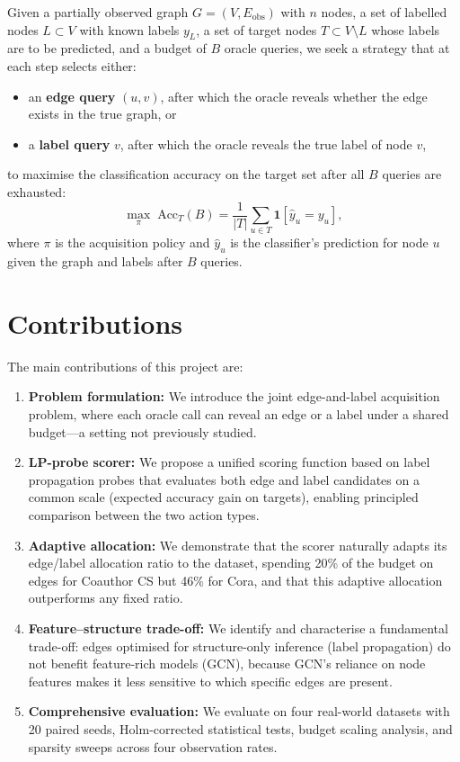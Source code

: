 \documentclass[12pt,a4paper,oneside]{report}
\begin{document}
Given a partially observed graph $G = (V, E_{\text{obs}})$ with $n$ nodes, a set of labelled nodes $L \subset V$ with known labels $y_L$, a set of target nodes $T \subset V \setminus L$ whose labels are to be predicted, and a budget of $B$ oracle queries, we seek a strategy that at each step selects either:
\begin{itemize}[leftmargin=2em]
    \item an \textbf{edge query} $(u, v)$, after which the oracle reveals whether the edge exists in the true graph, or
    \item a \textbf{label query} $v$, after which the oracle reveals the true label of node $v$,
\end{itemize}
to maximise the classification accuracy on the target set after all $B$ queries are exhausted:
\begin{equation}
    \max_{\pi} \; \mathrm{Acc}_T(B) = \frac{1}{|T|} \sum_{u \in T} \mathbf{1}[\hat{y}_u = y_u],
\end{equation}
where $\pi$ is the acquisition policy and $\hat{y}_u$ is the classifier's prediction for node $u$ given the graph and labels after $B$ queries.

\section{Contributions}

The main contributions of this project are:
\begin{enumerate}[leftmargin=2em]
    \item \textbf{Problem formulation:} We introduce the joint edge-and-label acquisition problem, where each oracle call can reveal an edge or a label under a shared budget---a setting not previously studied.

    \item \textbf{LP-probe scorer:} We propose a unified scoring function based on label propagation probes that evaluates both edge and label candidates on a common scale (expected accuracy gain on targets), enabling principled comparison between the two action types.

    \item \textbf{Adaptive allocation:} We demonstrate that the scorer naturally adapts its edge/label allocation ratio to the dataset, spending 20\% of the budget on edges for Coauthor CS but 46\% for Cora, and that this adaptive allocation outperforms any fixed ratio.

    \item \textbf{Feature--structure trade-off:} We identify and characterise a fundamental trade-off: edges optimised for structure-only inference (label propagation) do not benefit feature-rich models (GCN), because GCN's reliance on node features makes it less sensitive to which specific edges are present.

    \item \textbf{Comprehensive evaluation:} We evaluate on four real-world datasets with 20 paired seeds, Holm-corrected statistical tests, budget scaling analysis, and sparsity sweeps across four observation rates.
\end{enumerate}
\end{document}
